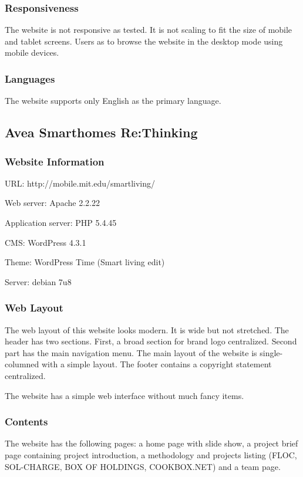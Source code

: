 \subsubsection*{Responsiveness}
The website is not responsive as tested. It is not scaling to fit the size of mobile and tablet screens. Users as to browse the website in the desktop mode using mobile devices.

\subsubsection*{Languages}
The website supports only English as the primary language.

\subsection{Avea Smarthomes Re:Thinking}
\subsubsection*{Website Information}
\begin{itemize*}
\item URL: http://mobile.mit.edu/smartliving/
\item Web server: Apache 2.2.22
\item Application server: PHP 5.4.45
\item CMS: WordPress 4.3.1
\item Theme: WordPress Time (Smart living edit)
\item Server: debian 7u8
\end{itemize*}

\subsubsection*{Web Layout}
The web layout of this website \cite{FedericoCasalegno.2014} looks modern. It is wide but not stretched. The header has two sections. First, a broad section for brand logo centralized. Second part has the main navigation menu. The main layout of the website is single-columned with a simple layout. The footer contains a copyright statement centralized.

The website has a simple web interface without much fancy items.

\subsubsection*{Contents}
The website has the following pages: a home page with slide show, a project brief page containing project introduction, a methodology and projects listing (FLOC, SOL-CHARGE, BOX OF HOLDINGS, COOKBOX.NET) and a team page.

